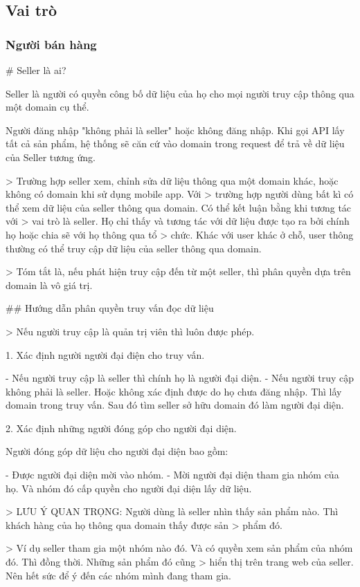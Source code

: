 \subsection{Vai trò}
\subsubsection{Người bán hàng}

\# Seller là ai?

Seller là người có quyền công bố dữ liệu của họ cho mọi người truy cập thông qua một domain cụ thể.

Người đăng nhập "không phải là seller" hoặc không đăng nhập. Khi gọi API lấy tất cả sản phẩm, hệ thống sẽ căn cứ vào
domain trong request để trả về dữ liệu của Seller tương ứng.

> Trường hợp seller xem, chỉnh sửa dữ liệu thông qua một domain khác, hoặc không có domain khi sử dụng mobile app. Với
> trường hợp người dùng bất kì có thể xem dữ liệu của seller thông qua domain. Có thể kết luận bằng khi tương tác với
> vai trò là seller. Họ chỉ thấy và tương tác với dữ liệu được tạo ra bởi chính họ hoặc chia sẽ với họ thông qua tổ
> chức. Khác với user khác ở chỗ, user thông thường có thể truy cập dữ liệu của seller thông qua domain.

> Tóm tắt là, nếu phát hiện truy cập đến từ một seller, thì phân quyền dựa trên domain là vô giá trị.

\#\# Hướng dẫn phân quyền truy vấn đọc dữ liệu

> Nếu người truy cập là quản trị viên thì luôn được phép.

1. Xác định người người đại điện cho truy vấn.

-   Nếu người truy cập là seller thì chính họ là người đại diện.
-   Nếu người truy cập không phải là seller. Hoặc không xác định được do họ chưa đăng nhập. Thì lấy domain trong truy
vấn. Sau đó tìm seller sở hữu domain đó làm người đại diện.

2. Xác định những người đóng góp cho người đại diện.

Người đóng góp dữ liệu cho người đại diện bao gồm:

-   Được người đại diện mời vào nhóm.
-   Mời người đại diện tham gia nhóm của họ. Và nhóm đó cấp quyền cho người đại diện lấy dữ liệu.

> LƯU Ý QUAN TRỌNG: Người dùng là seller nhìn thấy sản phẩm nào. Thì khách hàng của họ thông qua domain thấy được sản
> phẩm đó.

> Ví dụ seller tham gia một nhóm nào đó. Và có quyền xem sản phẩm của nhóm đó. Thì đồng thời. Những sản phẩm đó cũng
> hiển thị trên trang web của seller. Nên hết sức để ý đến các nhóm mình đang tham gia.

